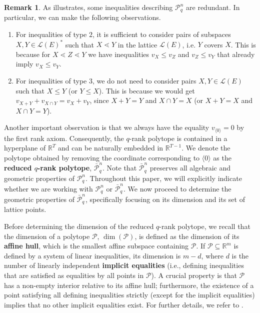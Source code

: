 \documentclass[a4paper,11pt,reqno]{amsart}
\theoremstyle{definition}
\newtheorem{remark}[theorem]{{{Remark}}}
\newcommand{\mL}{\mathcal{L}}
\newcommand{\la}{\langle}
\newcommand{\ra}{\rangle}
\newcommand{\rRP}{\bar{\mathcal{P}}_q^n}
\newcommand{\RP}{\mathcal{P}_q^n}
\begin{document}
{\begin{remark} As  illustrates, some inequalities describing $\mathcal{P}_q^n$ are redundant. In particular, we can make the following observations. 
\begin{enumerate}
    \item[(a)] For inequalities of type $2$, it is sufficient to consider pairs of subspaces $X,Y\in\mL(E)^\ast$ such that $X \lessdot Y$ in the lattice $\mL(E)$, i.e. $Y$ covers $X$. This is because for $X\lessdot Z\lessdot Y$ we have inequalities $v_X\leq v_Z$ and $v_Z\leq v_Y$ that already imply $v_X\leq v_Y$.
    \item[(b)] For inequalities of type $3$, we do not need to consider pairs $X,Y\in\mL(E)$ such that $X\leq Y$ (or $Y\leq X$). This is because we would get $v_{X+Y}+v_{X\cap Y}=v_{X}+v_{Y}$, since $X+Y = Y$ and $X\cap Y=X$ (or $X+Y = X$ and $X\cap Y=Y$).  
\end{enumerate}
\end{remark}


Another important observation is that we always have the equality $v_{\la0\ra}=0$ by the first rank axiom. 
Consequently, the $q$-rank polytope is contained in a hyperplane of $\mathbb{R}^T$ and can be naturally embedded in $\mathbb{R}^{T-1}$. We denote the polytope obtained by removing the coordinate corresponding to $\langle 0 \rangle$ as the \textbf{reduced $q$-rank polytope}, $\rRP$. Note that $\rRP$ preserves all algebraic and geometric properties of $\RP$. Throughout this paper, we will explicitly indicate whether we are working with $\RP$ or $\rRP$. We now proceed to determine the geometric properties of $\rRP$, specifically focusing on its dimension and its set of lattice points.


Before determining the dimension of the reduced $q$-rank polytope, we recall that the dimension of a polytope $\mathcal{P}$, $\dim(\mathcal{P})$, is defined as the dimension of its \textbf{affine hull}, which is the smallest affine subspace containing $\mathcal{P}$.
If $\mathcal{P} \subseteq \mathbb{R}^m$ is defined by a system of linear inequalities, its dimension is $m - d$, where $d$ is the number of linearly independent \textbf{implicit equalities} (i.e., defining inequalities that are satisfied as equalities by all points in $\mathcal{P}$). A crucial property is that $\mathcal{P}$ has a non-empty interior relative to its affine hull; furthermore, the existence of a point satisfying all defining inequalities strictly (except for the implicit equalities) implies that no other implicit equalities exist. For further details, we refer to \cite{ziegler2012lectures, schrijver1998theory}.


}
\end{document}
